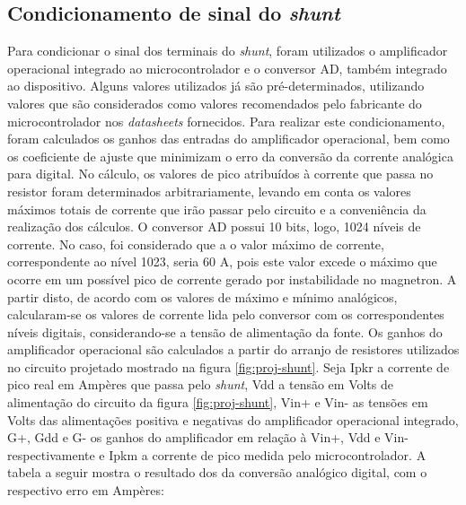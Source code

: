 \subsection{Condicionamento de sinal do \textit{shunt}}
Para condicionar o sinal dos terminais do \textit{shunt}, foram utilizados o amplificador operacional integrado ao microcontrolador e o conversor AD, também integrado ao dispositivo. Alguns valores utilizados já são pré-determinados, utilizando valores que são considerados como valores recomendados pelo fabricante do microcontrolador nos \textit{datasheets} fornecidos. Para realizar este condicionamento, foram calculados os ganhos das entradas do amplificador operacional, bem como os coeficiente de ajuste que minimizam o erro da conversão da corrente analógica para digital. No cálculo, os valores de pico atribuídos à corrente que passa no resistor foram determinados arbitrariamente, levando em conta os valores máximos totais de corrente que irão passar pelo circuito e a conveniência da realização dos cálculos. O conversor AD possui 10 bits, logo, 1024 níveis de corrente. No caso, foi considerado que a o valor máximo de corrente, correspondente ao nível 1023, seria 60 A, pois este valor excede o máximo que ocorre em um possível pico de corrente gerado por instabilidade no magnetron. A partir disto, de acordo com os valores de máximo e mínimo analógicos, calcularam-se os valores de corrente lida pelo conversor com os correspondentes níveis digitais, considerando-se a tensão de alimentação da fonte. Os ganhos do amplificador operacional são calculados a partir do arranjo de resistores utilizados no circuito projetado mostrado na figura \ref{fig:proj-shunt}. Seja Ipkr a corrente de pico real em Ampères que passa pelo \textit{shunt}, Vdd a tensão em Volts de alimentação do circuito da figura \ref{fig:proj-shunt}, Vin+ e Vin- as tensões em Volts das alimentações positiva e negativas do amplificador operacional integrado, G+, Gdd e G- os ganhos do amplificador em relação à Vin+, Vdd e Vin- respectivamente e Ipkm a corrente de pico medida pelo microcontrolador. A tabela a seguir mostra o resultado dos da conversão analógico digital, com o respectivo erro em Ampères:

